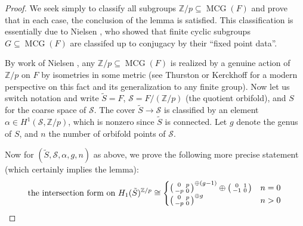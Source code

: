 \documentclass[12pt]{article}
\theoremstyle{plain}
\theoremstyle{definition}
\theoremstyle{remark}
\numberwithin{equation}{section}
\begin{document}
\begin{proof}
We seek simply to classify all subgroups $\mathbb Z/p\subseteq\operatorname{MCG}(F)$ and prove that in each case, the conclusion of the lemma is satisfied.  This classification is essentially due to Nielsen \cite{nielsen2}, who showed that finite cyclic subgroups $G\subseteq\operatorname{MCG}(F)$ are classifed up to conjugacy by their ``fixed point data''.

By work of Nielsen \cite{nielsen}, any $\mathbb Z/p\subseteq\operatorname{MCG}(F)$ is realized by a genuine action of $\mathbb Z/p$ on $F$ by isometries in some metric (see Thurston \cite{thurston} or Kerckhoff \cite{kerckhoff} for a modern perspective on this fact and its generalization to any finite group).   Now let us switch notation and write $\tilde S=F$, $\mathcal S=F/(\mathbb Z/p)$ (the quotient orbifold), and $S$ for the coarse space of $\mathcal S$.  The cover $\tilde S\to\mathcal S$ is classified by an element $\alpha\in H^1(\mathcal S,\mathbb Z/p)$, which is nonzero since $\tilde S$ is connected.  Let $g$ denote the genus of $S$, and $n$ the number of orbifold points of $\mathcal S$.

Now for $(\tilde S,\mathcal S,\alpha,g,n)$ as above, we prove the following more precise statement (which certainly implies the lemma):
\begin{equation}\label{fineintersectionformresult}
\text{the intersection form on }H_1(\tilde S)^{\mathbb Z/p}\cong
\begin{cases}
\left(\begin{smallmatrix}0&p\cr-p&0\end{smallmatrix}\right)^{\oplus(g-1)}\oplus\left(\begin{smallmatrix}0&1\cr-1&0\end{smallmatrix}\right)&n=0\cr
\left(\begin{smallmatrix}0&p\cr-p&0\end{smallmatrix}\right)^{\oplus g}&n>0
\end{cases}
\end{equation}


\end{proof}
\end{document}
